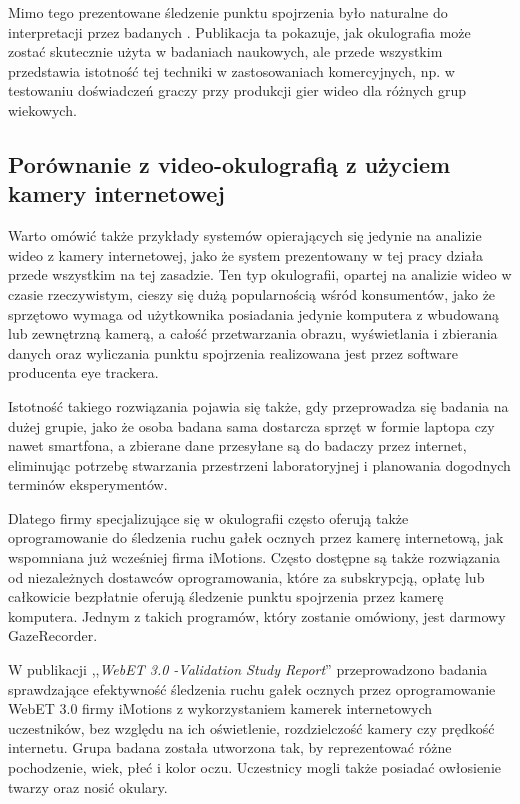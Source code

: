 \documentclass[a4paper,twoside,12pt]{book}
\newcommand{\obcy}[1]{\emph{#1}}
\newcommand{\english}[1]{{\selectlanguage{british}\obcy{#1}}}
\begin{document}
Mimo tego prezentowane śledzenie punktu spojrzenia było naturalne do interpretacji przez badanych \cite{bib:iMotions-children}. Publikacja ta pokazuje, jak okulografia może zostać skutecznie użyta w badaniach naukowych, ale przede wszystkim przedstawia istotność tej techniki w zastosowaniach komercyjnych, np. w testowaniu doświadczeń graczy przy produkcji gier wideo dla różnych grup wiekowych.

\subsection{Porównanie z video-okulografią z użyciem kamery internetowej}
\label{subsec:porownanie-z-video-okulografia-z-uzyciem-kamerki-internetowej}

Warto omówić także przykłady systemów opierających się jedynie na analizie wideo z kamery internetowej, jako że system prezentowany w tej pracy działa przede wszystkim na tej zasadzie. Ten typ okulografii, opartej na analizie wideo w czasie rzeczywistym, cieszy się dużą popularnością wśród konsumentów, jako że sprzętowo wymaga od użytkownika posiadania jedynie komputera z wbudowaną lub zewnętrzną kamerą, a całość przetwarzania obrazu, wyświetlania i zbierania danych oraz wyliczania punktu spojrzenia realizowana jest przez software producenta eye trackera.

Istotność takiego rozwiązania pojawia się także, gdy przeprowadza się badania na dużej grupie, jako że osoba badana sama dostarcza sprzęt w formie laptopa czy nawet smartfona, a zbierane dane przesyłane są do badaczy przez internet, eliminując potrzebę stwarzania przestrzeni laboratoryjnej i planowania dogodnych terminów eksperymentów.

Dlatego firmy specjalizujące się w okulografii często oferują także oprogramowanie do śledzenia ruchu gałek ocznych przez kamerę internetową, jak wspomniana już wcześniej firma iMotions. Często dostępne są także rozwiązania od niezależnych dostawców oprogramowania, które za subskrypcją, opłatę lub całkowicie bezpłatnie oferują śledzenie punktu spojrzenia przez kamerę komputera. Jednym z takich programów, który zostanie omówiony, jest darmowy GazeRecorder.

W publikacji ,,\english{WebET 3.0 -Validation Study Report}'' przeprowadzono badania sprawdzające efektywność śledzenia ruchu gałek ocznych przez oprogramowanie WebET 3.0 firmy iMotions z wykorzystaniem kamerek internetowych uczestników, bez względu na ich oświetlenie, rozdzielczość kamery czy prędkość internetu. Grupa badana została utworzona tak, by reprezentować różne pochodzenie, wiek, płeć i kolor oczu. Uczestnicy mogli także posiadać owłosienie twarzy oraz nosić okulary.
\end{document}
